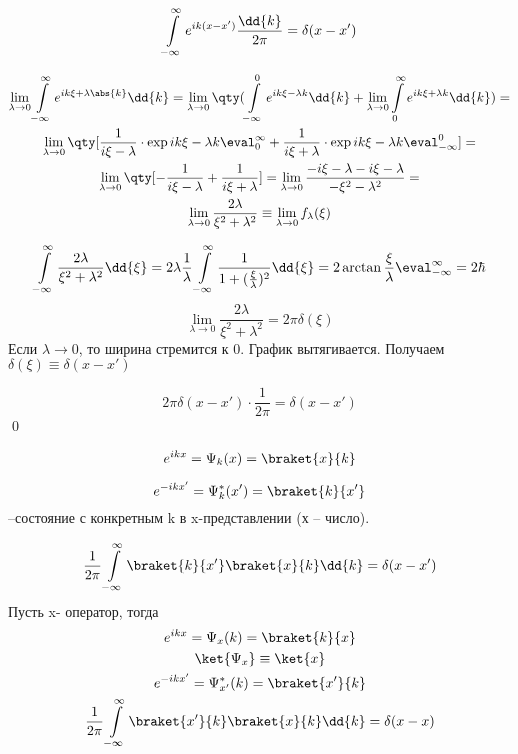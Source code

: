 $$\infint e^{ik(x-x')}\frac{\dd{k}}{2\pi}=\delta (x-x' )$$

\begin{gather*}
\lim\limits_{\lambda\rightarrow 0} \infint e^ {ik\xi+\lambda \abs{k}} \dd{k}=
\lim\limits_{\lambda\rightarrow 0} 
	\qty(\int \limits_{-\infty}^0 e^ {ik\xi-\lambda k} \dd{k}
+\lim\limits_{\lambda\rightarrow 0} 
	\int \limits_{0}^{\infty} e^ {ik\xi+\lambda k} \dd{k})
=\\\lim\limits_{\lambda\rightarrow 0} \qty[\frac{1}{i\xi-\lambda}\cdot\exp{ik\xi- \lambda k	 }\eval_0^{\infty}
+\frac{1}{i\xi+\lambda}\cdot\exp{ik\xi- \lambda k	 }\eval^0_{-\infty}] =\\
\lim\limits_{\lambda\rightarrow 0} \qty[-\frac{1}{i\xi- \lambda}+\frac{1}{i\xi+ \lambda}]= \lim\limits_{\lambda\rightarrow 0} \frac{-i\xi- \lambda - i \xi - \lambda}{- \xi^2 - \lambda^2}= 
\\
\lim\limits_{\lambda\rightarrow 0} \frac{2\lambda}{\xi^2+ \lambda^2}
\equiv  \lim\limits_{\lambda\rightarrow 0} f_{\lambda}(\xi)
\end{gather*}

\begin{gather*}
	\infint \frac{2\lambda}{\xi^2 + \lambda^2}\dd{\xi}=2 \lambda \frac{1}{\lambda}\infint \frac{1}{1+(\frac{\xi}{\lambda})^2}\dd{\xi}=
	2\arctan{\frac{\xi}{\lambda}}\eval_{-\infty}^{\infty}=2\hbar
\end{gather*}
$$\lim\limits_{\lambda\rightarrow 0} \frac{2 \lambda}{\xi^2+\lambda^2}=2\pi \delta(\xi)$$
Если $\lambda\rightarrow 0$, то ширина стремится к 0. График вытягивается. Получаем $\delta (\xi)\equiv \delta (x-x' )$

$$2\pi \delta(x-x')\cdot\frac{1}{2\pi}=\delta(x-x')$$
\qed

$$e^{ikx}=\Psi_k(x)=\braket{x}{k}$$

$$e^{-ikx' }=\Psi_k^*(x')=\braket{k}{x' }$$--состояние с конкретным k в x-представлении (х -- число).

$$\frac{1}{2\pi}\infint \braket{k}{x'}\braket{x}{k} \dd{k}=\delta(x-x' )$$
Пусть x- оператор, тогда
\begin{gather*}
	e^{ikx}=\Psi_x(k)=\braket{k}{x} \\
	\ket{\Psi_x}\equiv \ket{x} \\
	e^{-ikx'}=\Psi_{x'}^*(k)=\braket{x'}{k} \\
	\frac{1}{2\pi}\infint \braket{x'}{k}\braket{x}{k} \dd{k}= \delta(x-x)
\end{gather*}